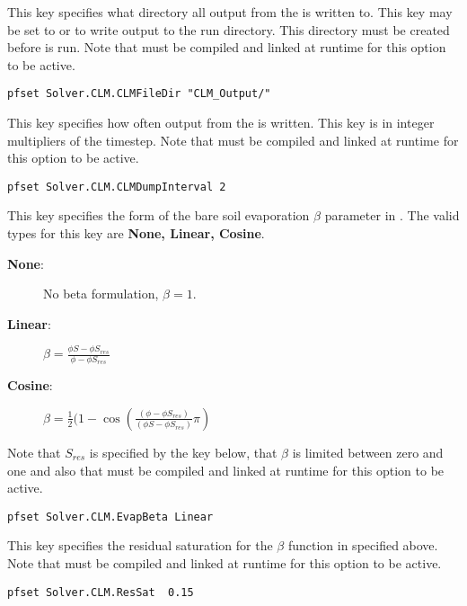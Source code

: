 {This key specifies what directory all output from the  is written to.  This key may be set to  or  to write output to the \parflow{} run directory.  This directory must be created before \parflow{} is run. Note that  must be compiled and linked at runtime for this option to be active.
}
\begin{display}\begin{verbatim}
pfset Solver.CLM.CLMFileDir "CLM_Output/"
\end{verbatim}\end{display}

{This key specifies how often output from the  is written.  This key is in integer multipliers of the  timestep. Note that  must be compiled and linked at runtime for this option to be active.
}
\begin{display}\begin{verbatim}
pfset Solver.CLM.CLMDumpInterval 2
\end{verbatim}\end{display}

{This key specifies the form of the bare soil evaporation $\beta$ parameter in .   The valid types for this key are {\bf None, Linear, Cosine}. \begin{description}
\item[{\bf None}: ] No beta formulation, $\beta=1$.
\item[{\bf Linear}: ] $\beta=\frac{\phi S-\phi S_{res}}{\phi-\phi S_{res}}$
\item[{\bf Cosine}: ] $\beta=\frac{1}{2}(1-\cos(\frac{(\phi -\phi S_{res})}{(\phi S-\phi S_{res})}\pi)$
\end{description}
Note that $S_{res}$ is specified by the key  below, that $\beta$ is limited between zero and one and also that  must be compiled and linked at runtime for this option to be active.
}
\begin{display}\begin{verbatim}
pfset Solver.CLM.EvapBeta Linear
\end{verbatim}\end{display}

{This key specifies the residual saturation for the $\beta$ function in  specified above.  Note that  must be compiled and linked at runtime for this option to be active.
}
\begin{display}\begin{verbatim}
pfset Solver.CLM.ResSat  0.15
\end{verbatim}\end{display}

